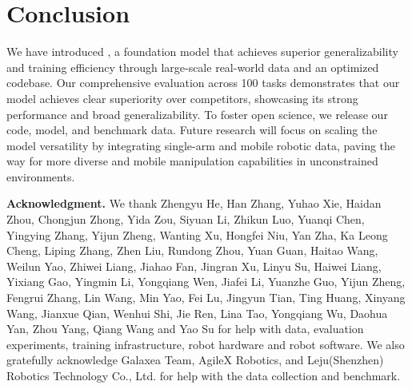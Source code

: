 \section{Conclusion}\label{sec:conclusion}

We have introduced \method, a foundation model that achieves superior generalizability and training efficiency through large-scale real-world data and an optimized codebase. 
%
Our comprehensive evaluation across 100 tasks demonstrates that our model achieves clear superiority over competitors, showcasing its strong performance and broad generalizability.
%
To foster open science, we release our code, model, and benchmark data.
%
Future research will focus on scaling the model versatility by integrating single-arm and mobile robotic data, paving the way for more diverse and mobile manipulation capabilities in unconstrained environments.



\noindent\textbf{Acknowledgment.}
We thank Zhengyu He, Han Zhang, Yuhao Xie, Haidan Zhou, Chongjun Zhong, Yida Zou, Siyuan Li, Zhikun Luo, Yuanqi Chen, Yingying Zhang, Yijun Zheng, Wanting Xu, Hongfei Niu, Yan Zha, Ka Leong Cheng, Liping Zhang, Zhen Liu, Rundong Zhou, Yuan Guan, Haitao Wang, Weilun Yao, Zhiwei Liang, Jiahao Fan, Jingran Xu, Linyu Su, Haiwei Liang, Yixiang Gao, Yingmin Li, Yongqiang Wen, Jiafei Li, Yuanzhe Guo, Yijun Zheng, Fengrui Zhang, Lin Wang, Min Yao, Fei Lu, Jingyun Tian, Ting Huang, Xinyang Wang, Jianxue Qian, Wenhui Shi, Jie Ren, Lina Tao, Yongqiang Wu, Daohua Yan, Zhou Yang, Qiang Wang and Yao Su for help with data, evaluation experiments, training infrastructure, robot hardware and robot software.
We also gratefully acknowledge Galaxea Team, AgileX Robotics, and Leju(Shenzhen) Robotics Technology Co., Ltd. for help with the data collection and benchmark.
